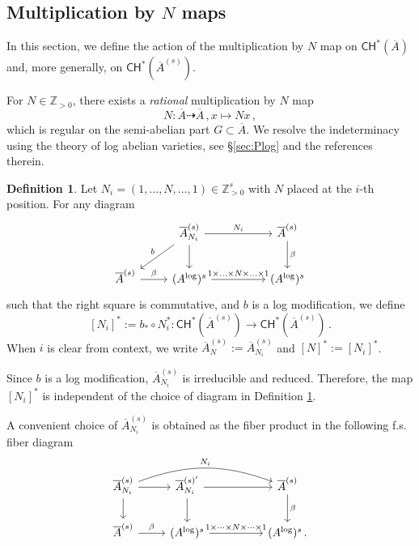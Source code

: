 \documentclass[11pt]{article}
\def\CH{\mathsf{CH}}
\def\ZZ{\mathbb{Z}}
\renewcommand{\log}{\mathrm{log}}
\newcommand{\barA}{\overline{A}}
\newcommand{\logA}{{A^{\log}}}
\theoremstyle{definition}
\newtheorem{definition}{Definition}[section]
\begin{document}
\subsection{Multiplication by $N$ maps}
\label{sec:mbyNmaps}

In this section, we define the action of the multiplication by $N$ map
on $\CH^*(\barA)$ and, more generally, on $\CH^*(\barA^{(s)})$.

For $N \in \ZZ_{>0}$, there exists a {\em rational} multiplication by $N$ map
\[
N : \barA \dashrightarrow \barA\,, x \mapsto Nx\,,
\]
which is regular on the semi-abelian part $G \subset \barA$. We resolve the indeterminacy using the theory of log abelian varieties, see \S\ref{sec:Plog} and the references therein.

\begin{definition}\label{def:n}
    Let $N_i =(1, \ldots ,N, \ldots , 1)\in \ZZ^s_{>0}$ with $N$ placed at the $i$-th position. For any diagram
    $$
    \begin{tikzcd}
	& {\barA_{N_i}^{(s)}} && {\barA^{(s)}} \\
	{\barA^{(s)}} & {(\logA)^s} && {(\logA)^{s}}
	\arrow["{N_i}", from=1-2, to=1-4]
	\arrow["b"', from=1-2, to=2-1]
	\arrow[from=1-2, to=2-2]
	\arrow["\beta", from=1-4, to=2-4]
	\arrow["\beta", from=2-1, to=2-2]
	\arrow["{1\times \ldots\times N\times \ldots  \times 1}", from=2-2, to=2-4]
    \end{tikzcd}
    $$
    such that the right square is commutative, and $b$ is a log modification, we define
    $$
    [N_i]^* := b_* \circ N_i^* : \CH^*(\barA^{(s)}) \longrightarrow \CH^*(\barA^{(s)})\, .
    $$
	When $i$ is clear from context, we write $\barA_{N}^{(s)}:=\barA_{N_i}^{(s)}$ and $[N]^{\ast}:=[N_i]^{\ast}$.
\end{definition}

Since $b$ is a log modification, $\barA_{N_i}^{(s)}$ is irreducible and reduced. Therefore, the map $[N_i]^*$ is independent of the choice of diagram in Definition \ref{def:n}.

A convenient choice of $\barA_{N_i}^{(s)}$ is obtained as the fiber product in the following f.s. fiber diagram
\begin{equation}\label{eq:n}
    \begin{tikzcd}
        \barA^{(s)}_{N_i} \ar[r] \ar[rrr, bend left=20, "N_i"] \ar[d] & \barA^{(s)'}_{N_i} \ar[rr] \ar[d] && \barA^{(s)} \ar[d,"\beta"] \\
        \barA^{(s)} \ar[r, "\beta"] & (\logA)^{s} \ar[rr,"1\times \cdots \times N \times \cdots \times 1"] && (\logA)^{s}\,.
    \end{tikzcd}
\end{equation}
\end{document}
